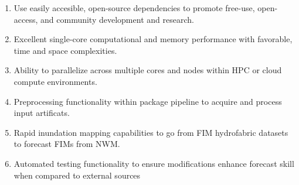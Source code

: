 \begin{enumerate}
\item Use easily accesible, open-source dependencies to promote free-use, open-access, and community development and research.
\item Excellent single-core computational and memory performance with favorable, time and space complexities.
\item Ability to parallelize across multiple cores and nodes within HPC or cloud compute environments.
\item Preprocessing functionality within package pipeline to acquire and process input artificats.
\item Rapid inundation mapping capabilities to go from FIM hydrofabric datasets to forecast FIMs from NWM.
\item Automated testing functionality to ensure modifications enhance forecast skill when compared to external sources
\end{enumerate} 

